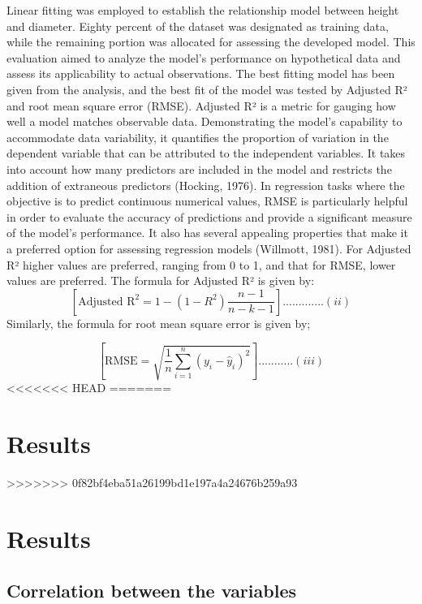 \documentclass[preprint, 3p,
authoryear]{elsarticle} %
\begin{document}
Linear fitting was employed to establish the relationship model between
height and diameter. Eighty percent of the dataset was designated as
training data, while the remaining portion was allocated for assessing
the developed model. This evaluation aimed to analyze the model's
performance on hypothetical data and assess its applicability to actual
observations. The best fitting model has been given from the analysis,
and the best fit of the model was tested by Adjusted R² and root mean
square error (RMSE). Adjusted R² is a metric for gauging how well a
model matches observable data. Demonstrating the model's capability to
accommodate data variability, it quantifies the proportion of variation
in the dependent variable that can be attributed to the independent
variables. It takes into account how many predictors are included in the
model and restricts the addition of extraneous predictors (Hocking,
1976). In regression tasks where the objective is to predict continuous
numerical values, RMSE is particularly helpful in order to evaluate the
accuracy of predictions and provide a significant measure of the model's
performance. It also has several appealing properties that make it a
preferred option for assessing regression models (Willmott, 1981). For
Adjusted R² higher values are preferred, ranging from 0 to 1, and that
for RMSE, lower values are preferred. The formula for Adjusted R² is
given by:
\[[\text{Adjusted R}^2 = 1 - \left(1 - R^2\right) \frac{n - 1}{n - k - 1}].............(ii)\]
Similarly, the formula for root mean square error is given by;

\[[ \text{RMSE} = \sqrt{\frac{1}{n}\sum_{i=1}^{n}(y_i - \hat{y}_i)^2} ]...........(iii)\]
<<<<<<< HEAD
=======

\hypertarget{results}{%
\section{Results}\label{results}}
>>>>>>> 0f82bf4eba51a26199bd1e197a4a24676b259a93

\hypertarget{results}{%
\section{Results}\label{results}}

\hypertarget{correlation-between-the-variables}{%
\subsection{Correlation between the
variables}\label{correlation-between-the-variables}}
\end{document}
